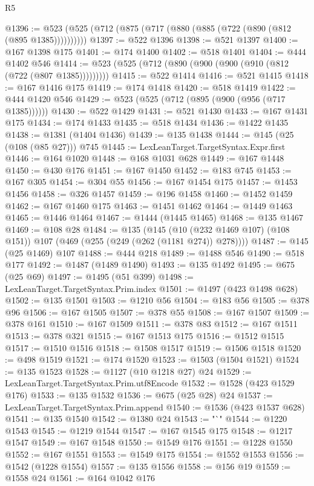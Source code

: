 \begin{lexlean}{R5}
\begin{coremodule}
{{{{{{{{{{{{{{{{{{{{{{{{{{{{{{{{{{{{{{{{{{{{{{{{{{{{{{{{{{{{{{@1396 := @523 (@525 (@712 (@875 (@717 (@880 (@885 (@722 (@890 (@812 (@895 @1385))))))))))
@1397 := @522 @1396
@1398 := @521 @1397
@1400 := @167 @1398 @175
@1401 := @174 @1400
@1402 := @518 @1401
@1404 := @444 @1402 @546
@1414 := @523 (@525 (@712 (@890 (@900 (@900 (@910 (@812 (@722 (@807 @1385)))))))))
@1415 := @522 @1414
@1416 := @521 @1415
@1418 := @167 @1416 @175
@1419 := @174 @1418
@1420 := @518 @1419
@1422 := @444 @1420 @546
@1429 := @523 (@525 (@712 (@895 (@900 (@956 (@717 @1385))))))
@1430 := @522 @1429
@1431 := @521 @1430
@1433 := @167 @1431 @175
@1434 := @174 @1433
@1435 := @518 @1434
@1436 := @1422 @1435
@1438 := @1381 (@1404 @1436)
@1439 := @135 @1438
@1444 := @145 (@25 (@108 (@85 @27))) @745
@1445 := LexLeanTarget.TargetSyntax.Expr.first
@1446 := @164 @1020
@1448 := @168 @1031 @628
@1449 := @167 @1448
@1450 := @430 @176
@1451 := @167 @1450
@1452 := @183 @745
@1453 := @167 @305
@1454 := @304 @55
@1456 := @167 @1454 @175
@1457 := @1453 @1456
@1458 := @326 @1457
@1459 := @196 @1458
@1460 := @1452 @1459
@1462 := @167 @1460 @175
@1463 := @1451 @1462
@1464 := @1449 @1463
@1465 := @1446 @1464
@1467 := @1444 (@1445 @1465)
@1468 := @135 @1467
@1469 := @108 @28
@1484 := @135
    (@145 (@10 (@232 @1469 @107) (@108 @151)) @107 (@469 (@255 (@249 (@262 (@1181 @274)) @278))))
@1487 := @145 (@25 @1469) @107
@1488 := @444 @218
@1489 := @1488 @546
@1490 := @518 @177
@1492 := @1487 (@1489 @1490)
@1493 := @135 @1492
@1495 := @675 (@25 @69)
@1497 := @1495 (@51 @399)
@1498 := LexLeanTarget.TargetSyntax.Prim.index
@1501 := @1497 (@423 @1498 @628)
@1502 := @135 @1501
@1503 := @1210 @56
@1504 := @183 @56
@1505 := @378 @96
@1506 := @167 @1505
@1507 := @378 @55
@1508 := @167 @1507
@1509 := @378 @161
@1510 := @167 @1509
@1511 := @378 @83
@1512 := @167 @1511
@1513 := @378 @321
@1515 := @167 @1513 @175
@1516 := @1512 @1515
@1517 := @1510 @1516
@1518 := @1508 @1517
@1519 := @1506 @1518
@1520 := @498 @1519
@1521 := @174 @1520
@1523 := @1503 (@1504 @1521)
@1524 := @135 @1523
@1528 := @1127 (@10 @1218 @27) @24
@1529 := LexLeanTarget.TargetSyntax.Prim.utf8Encode
@1532 := @1528 (@423 @1529 @176)
@1533 := @135 @1532
@1536 := @675 (@25 @28) @24
@1537 := LexLeanTarget.TargetSyntax.Prim.append
@1540 := @1536 (@423 @1537 @628)
@1541 := @135 @1540
@1542 := @1380 @24
@1543 := "`"
@1544 := @1220 @1543
@1545 := @1219 @1544
@1547 := @167 @1545 @175
@1548 := @1217 @1547
@1549 := @167 @1548
@1550 := @1549 @176
@1551 := @1228 @1550
@1552 := @167 @1551
@1553 := @1549 @175
@1554 := @1552 @1553
@1556 := @1542 (@1228 @1554)
@1557 := @135 @1556
@1558 := @156 @19
@1559 := @1558 @24
@1561 := @164 @1042 @176
}}}}}}}}}}}}}}}}}}}}}}}}}}}}}}}}}}}}}}}}}}}}}}}}}}}}}}}}}}}}}}
\end{coremodule}
\end{lexlean}
